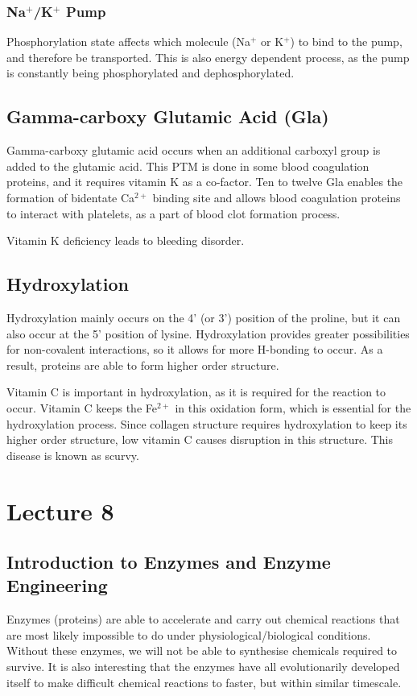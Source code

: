 \documentclass[a4paper, 12pt]{report}
\newcommand{\mychapter}[2]{
    \setcounter{chapter}{#1}
    \setcounter{section}{0}
    \chapter*{#2}
    \addcontentsline{toc}{chapter}{#2}
}
\begin{document}
\subsection{Na$^+$/K$^+$ Pump}

Phosphorylation state affects which molecule (Na$^+$ or K$^+$) to bind to the pump, and therefore be transported.
This is also energy dependent process, as the pump is constantly being phosphorylated and dephosphorylated.

\section{Gamma-carboxy Glutamic Acid (Gla)}

Gamma-carboxy glutamic acid occurs when an additional carboxyl group is added to the glutamic acid.
This PTM is done in some blood coagulation proteins, and it requires vitamin K as a co-factor.
Ten to twelve Gla enables the formation of bidentate Ca$^{2+}$ binding site and allows blood coagulation proteins to interact with platelets, as a part of blood clot formation process.

Vitamin K deficiency leads to bleeding disorder.

\section{Hydroxylation}

Hydroxylation mainly occurs on the 4' (or 3') position of the proline, but it can also occur at the 5' position of lysine.
Hydroxylation provides greater possibilities for non-covalent interactions, so it allows for more H-bonding to occur.
As a result, proteins are able to form higher order structure.

Vitamin C is important in hydroxylation, as it is required for the reaction to occur.
Vitamin C keeps the Fe$^{2+}$ in this oxidation form, which is essential for the hydroxylation process.
Since collagen structure requires hydroxylation to keep its higher order structure, low vitamin C causes disruption in this structure.
This disease is known as scurvy.

\mychapter{8}{Lecture 8}

\section{Introduction to Enzymes and Enzyme Engineering}

Enzymes (proteins) are able to accelerate and carry out chemical reactions that are most likely impossible to do under physiological/biological conditions.
Without these enzymes, we will not be able to synthesise chemicals required to survive.
It is also interesting that the enzymes have all evolutionarily developed itself to make difficult chemical reactions to faster, but within similar timescale.
\end{document}
